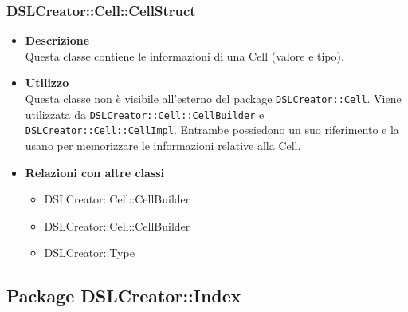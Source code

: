 \subsubsection{DSLCreator::Cell::CellStruct}
                    \begin{itemize}
                        \item \textbf{Descrizione} \hfill \\
                            Questa classe contiene le informazioni di una Cell (valore e tipo).
                        \item \textbf{Utilizzo} \hfill \\
                            Questa classe non è visibile all'esterno del package \texttt{DSLCreator::Cell}. Viene utilizzata da \texttt{DSLCreator::Cell::CellBuilder} e \texttt{DSLCreator::Cell::CellImpl}. Entrambe possiedono un suo riferimento e la usano per memorizzare le informazioni relative alla Cell.
                        \item \textbf{Relazioni con altre classi}
                            \begin{itemize}
                              \item DSLCreator::Cell::CellBuilder
                              \item DSLCreator::Cell::CellBuilder
                              \item DSLCreator::Type
                            \end{itemize}
                    \end{itemize}

\subsection{Package DSLCreator::Index}
